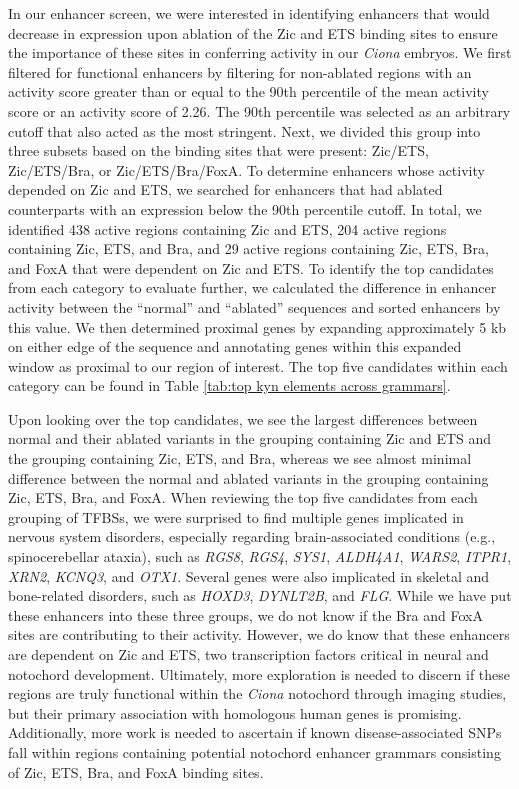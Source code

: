 In our enhancer screen, we were interested in identifying enhancers that would decrease in expression upon ablation of the Zic and ETS binding sites to ensure the importance of these sites in conferring activity in our \textit{Ciona} embryos. We first filtered for functional enhancers by filtering for non-ablated regions with an activity score greater than or equal to the 90th percentile of the mean activity score or an activity score of 2.26. The 90th percentile was selected as an arbitrary cutoff that also acted as the most stringent. Next, we divided this group into three subsets based on the binding sites that were present: Zic/ETS, Zic/ETS/Bra, or Zic/ETS/Bra/FoxA. To determine enhancers whose activity depended on Zic and ETS, we searched for enhancers that had ablated counterparts with an expression below the 90th percentile cutoff. In total, we identified 438 active regions containing Zic and ETS, 204 active regions containing Zic, ETS, and Bra, and 29 active regions containing Zic, ETS, Bra, and FoxA that were dependent on Zic and ETS. To identify the top candidates from each category to evaluate further, we calculated the difference in enhancer activity between the “normal” and “ablated” sequences and sorted enhancers by this value. We then determined proximal genes by expanding approximately 5 kb on either edge of the sequence and annotating genes within this expanded window as proximal to our region of interest. The top five candidates within each category can be found in Table \ref{tab:top kyn elements across grammars}.

Upon looking over the top candidates, we see the largest differences between normal and their ablated variants in the grouping containing Zic and ETS and the grouping containing Zic, ETS, and Bra, whereas we see almost minimal difference between the normal and ablated variants in the grouping containing Zic, ETS, Bra, and FoxA. When reviewing the top five candidates from each grouping of TFBSs, we were surprised to find multiple genes implicated in nervous system disorders, especially regarding brain-associated conditions (e.g., spinocerebellar ataxia), such as \textit{RGS8}, \textit{RGS4}, \textit{SYS1}, \textit{ALDH4A1}, \textit{WARS2}, \textit{ITPR1}, \textit{XRN2}, \textit{KCNQ3}, and \textit{OTX1}. Several genes were also implicated in skeletal and bone-related disorders, such as \textit{HOXD3}, \textit{DYNLT2B}, and \textit{FLG}. While we have put these enhancers into these three groups, we do not know if the Bra and FoxA sites are contributing to their activity. However, we do know that these enhancers are dependent on Zic and ETS, two transcription factors critical in neural and notochord development. Ultimately, more exploration is needed to discern if these regions are truly functional within the \textit{Ciona} notochord through imaging studies, but their primary association with homologous human genes is promising. Additionally, more work is needed to ascertain if known disease-associated SNPs fall within regions containing potential notochord enhancer grammars consisting of Zic, ETS, Bra, and FoxA binding sites. 

